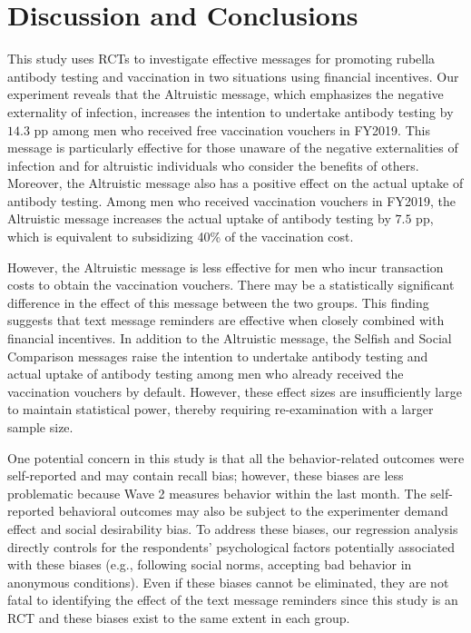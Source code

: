\documentclass[
]{article}
\begin{document}
\hypertarget{conclusion}{%
\section{Discussion and Conclusions}\label{conclusion}}

This study uses RCTs to investigate effective messages for promoting rubella antibody testing and vaccination in two situations using financial incentives. Our experiment reveals that the Altruistic message, which emphasizes the negative externality of infection, increases the intention to undertake antibody testing by \(14.3\) pp among men who received free vaccination vouchers in FY2019. This message is particularly effective for those unaware of the negative externalities of infection and for altruistic individuals who consider the benefits of others. Moreover, the Altruistic message also has a positive effect on the actual uptake of antibody testing. Among men who received vaccination vouchers in FY2019, the Altruistic message increases the actual uptake of antibody testing by \(7.5\) pp, which is equivalent to subsidizing 40\% of the vaccination cost.

However, the Altruistic message is less effective for men who incur transaction costs to obtain the vaccination vouchers. There may be a statistically significant difference in the effect of this message between the two groups. This finding suggests that text message reminders are effective when closely combined with financial incentives. In addition to the Altruistic message, the Selfish and Social Comparison messages raise the intention to undertake antibody testing and actual uptake of antibody testing among men who already received the vaccination vouchers by default. However, these effect sizes are insufficiently large to maintain statistical power, thereby requiring re-examination with a larger sample size.

One potential concern in this study is that all the behavior-related outcomes were self-reported and may contain recall bias; however, these biases are less problematic because Wave 2 measures behavior within the last month. The self-reported behavioral outcomes may also be subject to the experimenter demand effect and social desirability bias. To address these biases, our regression analysis directly controls for the respondents' psychological factors potentially associated with these biases (e.g., following social norms, accepting bad behavior in anonymous conditions). Even if these biases cannot be eliminated, they are not fatal to identifying the effect of the text message reminders since this study is an RCT and these biases exist to the same extent in each group.
\end{document}
